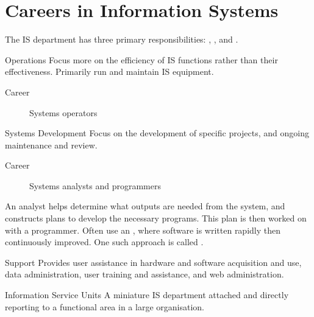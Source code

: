 \documentclass[\main/notes.tex]{subfiles}
\begin{document}
		\section{Careers in Information Systems}
			The IS department has three primary responsibilities: , , and .
			\begin{sidenote}{Operations}
				Focus more on the efficiency of IS functions rather than their effectiveness. Primarily run and maintain IS equipment.
				\begin{description}
					\item[Career] Systems operators
				\end{description}
			\end{sidenote}
			\begin{sidenote}{Systems Development}
				Focus on the development of specific projects, and ongoing maintenance and review.
				\begin{description}
					\item[Career] Systems analysts and programmers
				\end{description}
				An analyst helps determine what outputs are needed from the system, and constructs plans to develop the necessary programs. This plan is then worked on with a programmer. Often use an , where software is written rapidly then continuously improved. One such approach is called .
			\end{sidenote}
			\begin{sidenote}{Support}
				Provides user assistance in hardware and software acquisition and use, data administration, user training and assistance, and web administration.
			\end{sidenote}
			\begin{definition}{Information Service Units}
				A miniature IS department attached and directly reporting to a functional area in a large organisation.
			\end{definition}
\end{document}
